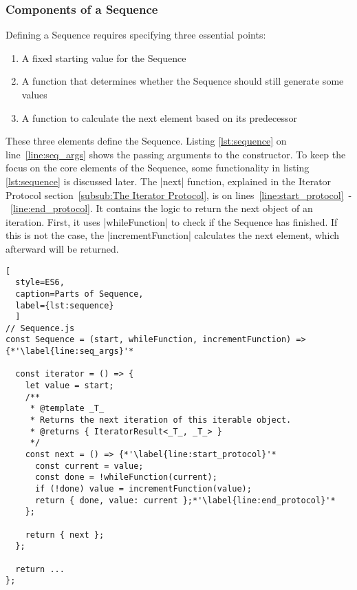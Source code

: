 \subsubsection{Components of a Sequence}
\label{subsub:Components of a Sequence}
Defining a Sequence requires specifying three essential points:
\begin{enumerate}
  \item{A fixed starting value for the Sequence} 
  \item{A function that determines whether the Sequence should still generate
    some values} 
  \item{A function to calculate the next element based on its predecessor} 
\end{enumerate}
These three elements define the Sequence. Listing \ref{lst:sequence} on
line~\ref{line:seq_args} shows the passing arguments to the constructor.
To keep the focus on the core elements of the Sequence, some functionality in 
listing \ref{lst:sequence} is discussed later. The |next| function, explained in 
the Iterator Protocol section~\ref{subsub:The Iterator Protocol}, 
is on lines~\ref{line:start_protocol}~-~\ref{line:end_protocol}. It contains the 
logic to return the next object of an iteration. First, it uses |whileFunction| 
to check if the Sequence has finished. If this is not the case, the
|incrementFunction| calculates the next element, which afterward will be
returned.

\begin{lstlisting}[
  style=ES6, 
  caption=Parts of Sequence,
  label={lst:sequence}
  ]
// Sequence.js
const Sequence = (start, whileFunction, incrementFunction) => {*'\label{line:seq_args}'*

  const iterator = () => {
    let value = start;
    /**
     * @template _T_
     * Returns the next iteration of this iterable object.
     * @returns { IteratorResult<_T_, _T_> }
     */
    const next = () => {*'\label{line:start_protocol}'*
      const current = value;
      const done = !whileFunction(current);
      if (!done) value = incrementFunction(value);
      return { done, value: current };*'\label{line:end_protocol}'*
    };

    return { next };
  };

  return ... 
};
\end{lstlisting}


